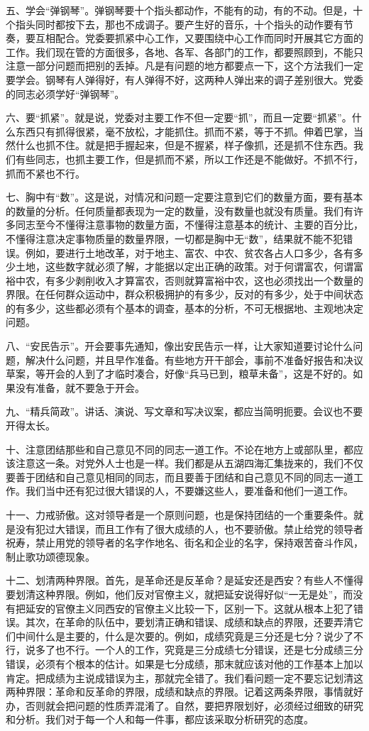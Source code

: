 五、学会“弹钢琴”。弹钢琴要十个指头都动作，不能有的动，有的不动。但是，十个指头同时都按下去，那也不成调子。要产生好的音乐，十个指头的动作要有节奏，要互相配合。党委要抓紧中心工作，又要围绕中心工作而同时开展其它方面的工作。我们现在管的方面很多，各地、各军、各部门的工作，都要照顾到，不能只注意一部分问题而把别的丢掉。凡是有问题的地方都要点一下，这个方法我们一定要学会。钢琴有人弹得好，有人弹得不好，这两种人弹出来的调子差别很大。党委的同志必须学好“弹钢琴”。

六、要“抓紧”。就是说，党委对主要工作不但一定要“抓”，而且一定要“抓紧”。什么东西只有抓得很紧，毫不放松，才能抓住。抓而不紧，等于不抓。伸着巴掌，当然什么也抓不住。就是把手握起来，但是不握紧，样子像抓，还是抓不住东西。我们有些同志，也抓主要工作，但是抓而不紧，所以工作还是不能做好。不抓不行，抓而不紧也不行。

七、胸中有“数”。这是说，对情况和问题一定要注意到它们的数量方面，要有基本的数量的分析。任何质量都表现为一定的数量，没有数量也就没有质量。我们有许多同志至今不懂得注意事物的数量方面，不懂得注意基本的统计、主要的百分比，不懂得注意决定事物质量的数量界限，一切都是胸中无“数”，结果就不能不犯错误。例如，要进行土地改革，对于地主、富农、中农、贫农各占人口多少，各有多少土地，这些数字就必须了解，才能据以定出正确的政策。对于何谓富农，何谓富裕中农，有多少剥削收入才算富农，否则就算富裕中农，这也必须找出一个数量的界限。在任何群众运动中，群众积极拥护的有多少，反对的有多少，处于中间状态的有多少，这些都必须有个基本的调查，基本的分析，不可无根据地、主观地决定问题。

八、“安民告示”。开会要事先通知，像出安民告示一样，让大家知道要讨论什么问题，解决什么问题，并且早作准备。有些地方开干部会，事前不准备好报告和决议草案，等开会的人到了才临时凑合，好像“兵马已到，粮草未备”，这是不好的。如果没有准备，就不要急于开会。

九、“精兵简政”。讲话、演说、写文章和写决议案，都应当简明扼要。会议也不要开得太长。

十、注意团结那些和自己意见不同的同志一道工作。不论在地方上或部队里，都应该注意这一条。对党外人士也是一样。我们都是从五湖四海汇集拢来的，我们不仅要善于团结和自己意见相同的同志，而且要善于团结和自己意见不同的同志一道工作。我们当中还有犯过很大错误的人，不要嫌这些人，要准备和他们一道工作。

十一、力戒骄傲。这对领导者是一个原则问题，也是保持团结的一个重要条件。就是没有犯过大错误，而且工作有了很大成绩的人，也不要骄傲。禁止给党的领导者祝寿，禁止用党的领导者的名字作地名、街名和企业的名字，保持艰苦奋斗作风，制止歌功颂德现象。

十二、划清两种界限。首先，是革命还是反革命？是延安还是西安？有些人不懂得要划清这种界限。例如，他们反对官僚主义，就把延安说得好似“一无是处”，而没有把延安的官僚主义同西安的官僚主义比较一下，区别一下。这就从根本上犯了错误。其次，在革命的队伍中，要划清正确和错误、成绩和缺点的界限，还要弄清它们中间什么是主要的，什么是次要的。例如，成绩究竟是三分还是七分？说少了不行，说多了也不行。一个人的工作，究竟是三分成绩七分错误，还是七分成绩三分错误，必须有个根本的估计。如果是七分成绩，那末就应该对他的工作基本上加以肯定。把成绩为主说成错误为主，那就完全错了。我们看问题一定不要忘记划清这两种界限：革命和反革命的界限，成绩和缺点的界限。记着这两条界限，事情就好办，否则就会把问题的性质弄混淆了。自然，要把界限划好，必须经过细致的研究和分析。我们对于每一个人和每一件事，都应该采取分析研究的态度。


